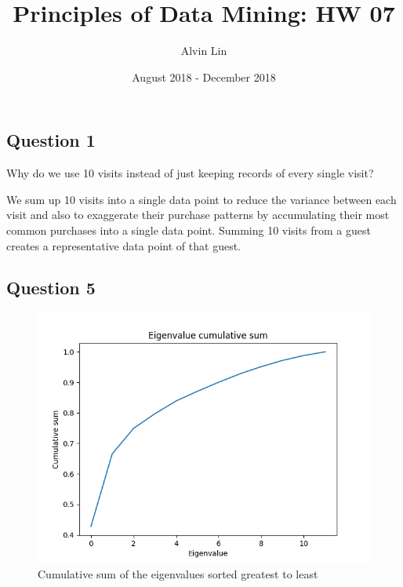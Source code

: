 \documentclass{math}
\title{Principles of Data Mining: HW 07}
\author{Alvin Lin}
\date{August 2018 - December 2018}
\begin{document}
\maketitle

\subsection*{Question 1}
Why do we use 10 visits instead of just keeping records of every single visit?
\par
We sum up 10 visits into a single data point to reduce the variance between
each visit and also to exaggerate their purchase patterns by accumulating their
most common purchases into a single data point. Summing 10 visits from a guest
creates a representative data point of that guest.

\subsection*{Question 5}
\begin{figure}[H]
  \centering
  \includegraphics[width=15cm]{assets/hw_07_eigenvalue_cumsum.png}
  \caption{Cumulative sum of the eigenvalues sorted greatest to least}
\end{figure}
\end{document}
